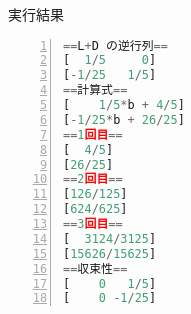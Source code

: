 \documentclass[12pt,b5paper]{ltjsarticle}
\begin{document}
実行結果

\begin{lstlisting}[language=Python,basicstyle={\small},frame=single,numbers=left]
 ==L+D の逆行列==
[  1/5     0]
[-1/25   1/5]
==計算式==
[    1/5*b + 4/5]
[-1/25*b + 26/25]
==1回目==
[  4/5]
[26/25]
==2回目==
[126/125]
[624/625]
==3回目==
[  3124/3125]
[15626/15625]
==収束性==
[    0   1/5]
[    0 -1/25]
\end{lstlisting}
\end{document}
